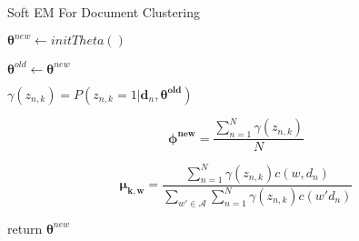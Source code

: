 \documentclass[a4paper]{article}
\begin{document}
	\begin{algorithm}
		\caption{Soft EM For Document Clustering}
		\begin{algorithmic}[1]
			
			\State $\mathbf{\theta}^{new} \gets initTheta()$ 
			
			\Do
			\State $\mathbf{\theta}^{old} \gets \mathbf{\theta}^{new}$
			
			
			
			\State $\gamma(z_{n,k}) = P(z_{n,k} = 1 | \mathbf{d}_n, \mathbf{\theta^{old}})$ 
			
			\State $$\mathbf{\phi^{new}} = \frac{\sum^{N}_{n=1}\gamma(z_{n,k})}{N}$$
			
			\State $$\mathbf{\mu_{k,w}} = 
			\frac
			{\sum^{N}_{n=1}\gamma(z_{n,k})c(w, d_n)} {\sum_{w' \in \mathcal{A}} \sum^{N}_{n=1} \gamma(z_{n,k})c(w' d_n)}$$ 
			
			\EndFor
			
			\EndFor
			
			
			\State return {$\mathbf{\theta}^{new}$}
			
			\EndProcedure
		\end{algorithmic}
	\end{algorithm}
	
\end{document}
